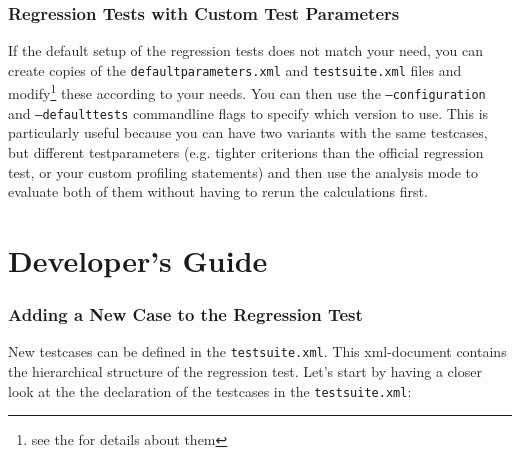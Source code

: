 \documentclass[a4paper,12pt]{scrartcl}
\begin{document}
\section{Regression Tests with Custom Test Parameters}
If the default setup of the regression tests does not match your need, you can create copies of the
\texttt{defaultparameters.xml} and \texttt{testsuite.xml} files and modify\footnote{see the  for
details about them} these according to your needs. You can then use the \texttt{--configuration} and
\texttt{--defaulttests} commandline flags to specify which version to use. This is particularly useful because you
can have two variants with the same testcases, but different testparameters (e.g. tighter criterions than the
official regression test, or your custom profiling statements) and then use the analysis mode to evaluate both of
them without having to rerun the calculations first.

\newpage
\part{Developer's Guide}\label{devguide}

\section{Adding a New Case to the Regression Test}
New testcases can be defined in the \texttt{testsuite.xml}. This xml-document contains the hierarchical structure of
the regression test. Let's start by having a closer look at the the declaration of the testcases in the
\texttt{testsuite.xml}:
\end{document}
